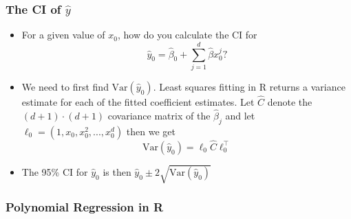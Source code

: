\documentclass{article}
\begin{document}
\subsubsection{The CI of $\hat{y}$}
\begin{itemize}
    \item For a given value of $x_0$, how do you calculate the CI for 
    \begin{equation*}
        \hat{y}_0 = \hat{\beta}_0 + \sum_{j=1}^d \hat{\beta} x_0^j ?
    \end{equation*}
    \item We need to first find $\mathrm{Var}(\hat{y}_0)$. Least squares fitting in R returns a variance estimate for each of the fitted coefficient estimates. Let $\hat{C}$ denote the $(d+1) \cdot (d+1)$ covariance matrix of the $\hat{\beta}_j$ and let $\ell_0 = (1,x_0,x_0^2,...,x_0^d)$ then we get
    \begin{equation*}
        \mathrm{Var}(\hat{y}_0)= \ell_0 \hat{C}\ell_0^\top
    \end{equation*}
    \item The 95\% CI for $\hat{y}_0$ is then $\hat{y}_0 \pm 2 \sqrt{\mathrm{Var}(\hat{y}_0)}$
\end{itemize}

\subsubsection{Polynomial Regression in R}
\end{document}
